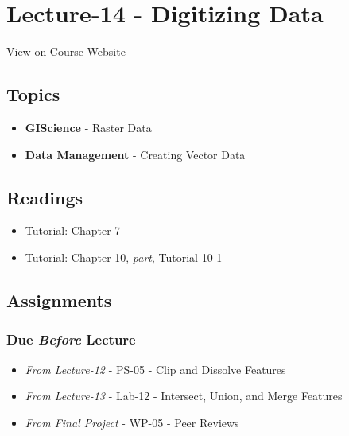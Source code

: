 \documentclass[
]{book}
\providecommand{\tightlist}{%
  \setlength{\itemsep}{0pt}\setlength{\parskip}{0pt}}
\begin{document}
\hypertarget{lecture-14---digitizing-data}{%
\section*{Lecture-14 - Digitizing Data}\label{lecture-14---digitizing-data}}

View on Course Website

\hypertarget{topics-14}{%
\subsection*{Topics}\label{topics-14}}

\begin{itemize}
\tightlist
\item
  \textbf{GIScience} - Raster Data
\item
  \textbf{Data Management} - Creating Vector Data
\end{itemize}

\hypertarget{readings-14}{%
\subsection*{Readings}\label{readings-14}}

\begin{itemize}
\tightlist
\item
  Tutorial: Chapter 7
\item
  Tutorial: Chapter 10, \emph{part}, Tutorial 10-1
\end{itemize}

\hypertarget{assignments-15}{%
\subsection*{Assignments}\label{assignments-15}}

\hypertarget{due-before-lecture-13}{%
\subsubsection*{\texorpdfstring{Due \emph{Before} Lecture}{Due Before Lecture}}\label{due-before-lecture-13}}

\begin{itemize}
\tightlist
\item
  \emph{From Lecture-12} - PS-05 - Clip and Dissolve Features
\item
  \emph{From Lecture-13} - Lab-12 - Intersect, Union, and Merge Features
\item
  \emph{From Final Project} - WP-05 - Peer Reviews
\end{itemize}
\end{document}
